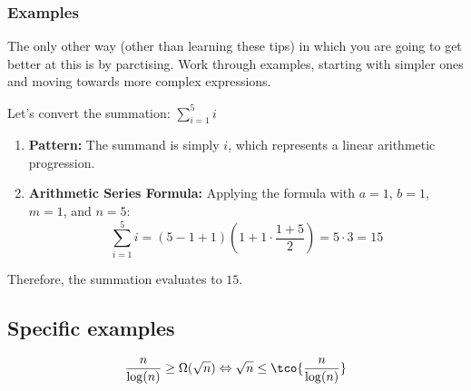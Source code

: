 \subsubsection{Examples}
The only other way (other than learning these tips) in which you are going to get better at this is by parctising.
Work through examples, starting with simpler ones and moving towards more complex expressions.



Let's convert the summation: $\sum_{i=1}^{5} i$

\begin{enumerate}
    \item \textbf{Pattern:} The summand is simply $i$, which represents a linear arithmetic progression.

    \item \textbf{Arithmetic Series Formula:} Applying the formula with $a = 1$, $b = 1$, $m = 1$, and $n = 5$:
          \[
              \sum_{i=1}^{5} i = (5 - 1 + 1)\left(1 + 1 \cdot \frac{1 + 5}{2}\right) = 5 \cdot 3 = 15
          \]
\end{enumerate}

Therefore, the summation evaluates to $15$.

\subsection{Specific examples}
\begin{align*}
    \frac{n}{\log(n)} \geq \Omega(\sqrt{n}) \Leftrightarrow \sqrt{n} \leq \tco{\frac{n}{\log(n)}}
\end{align*}
